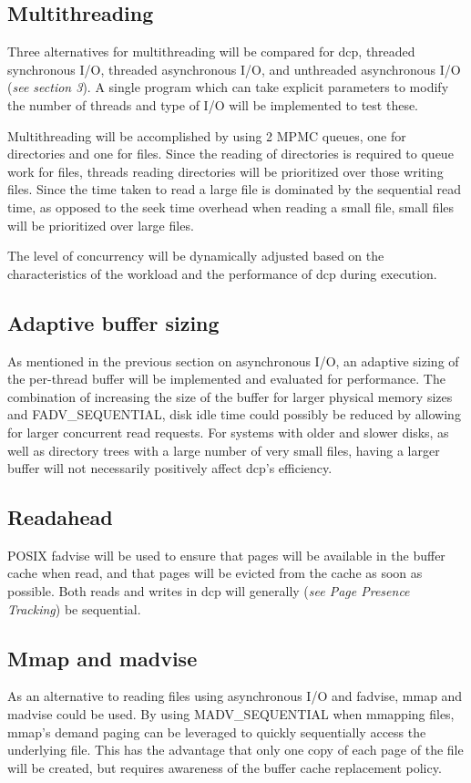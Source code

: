 \documentclass[12pt]{article}
\begin{document}
\subsection{Multithreading}
Three alternatives for multithreading will be compared for dcp,
threaded synchronous I/O, threaded asynchronous I/O, and unthreaded
asynchronous I/O (\textit{see section 3}). A single program which
can take explicit parameters to modify the number of threads and
type of I/O will be implemented to test these.

Multithreading will be accomplished by using 2 MPMC queues,
one for directories and one for files. Since the reading of
directories is required to queue work for files, threads
reading directories will be prioritized over those writing files.
Since the time taken to read a large file is dominated by
the sequential read time, as opposed to the seek time overhead
when reading a small file, small files will be prioritized over
large files.

The level of concurrency will be dynamically adjusted based
on the characteristics of the workload and the performance
of dcp during execution.

\subsection{Adaptive buffer sizing}
As mentioned in the previous section on asynchronous I/O, an adaptive
sizing of the per-thread buffer will be implemented and evaluated for
performance. The combination of increasing the size of the buffer for
larger physical memory sizes and FADV\_SEQUENTIAL, disk idle time could
possibly be reduced by allowing for larger concurrent read requests.
For systems with older and slower disks, as well as directory trees
with a large number of very small files, having a larger buffer
will not necessarily positively affect dcp's efficiency.

\subsection{Readahead}
POSIX fadvise will be used to ensure that pages will be available
in the buffer cache when read, and that pages will be evicted from
the cache as soon as possible. Both reads and writes in dcp will
generally (\textit{see Page Presence Tracking}) be sequential.

\subsection{Mmap and madvise}
As an alternative to reading files using asynchronous I/O and fadvise,
mmap and madvise could be used. By using MADV\_SEQUENTIAL when mmapping
files, mmap's demand paging can be leveraged to quickly sequentially access
the underlying file. This has the advantage that only one copy of each
page of the file will be created, but requires awareness of the buffer
cache replacement policy.
\end{document}
